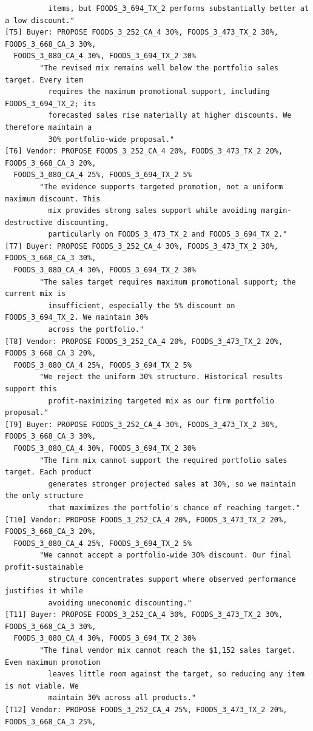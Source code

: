 {\begin{verbatim}
          items, but FOODS_3_694_TX_2 performs substantially better at a low discount."
[T5] Buyer: PROPOSE FOODS_3_252_CA_4 30%, FOODS_3_473_TX_2 30%, FOODS_3_668_CA_3 30%,
  FOODS_3_080_CA_4 30%, FOODS_3_694_TX_2 30%
        "The revised mix remains well below the portfolio sales target. Every item
          requires the maximum promotional support, including FOODS_3_694_TX_2; its
          forecasted sales rise materially at higher discounts. We therefore maintain a
          30% portfolio-wide proposal."
[T6] Vendor: PROPOSE FOODS_3_252_CA_4 20%, FOODS_3_473_TX_2 20%, FOODS_3_668_CA_3 20%,
  FOODS_3_080_CA_4 25%, FOODS_3_694_TX_2 5%
        "The evidence supports targeted promotion, not a uniform maximum discount. This
          mix provides strong sales support while avoiding margin-destructive discounting,
          particularly on FOODS_3_473_TX_2 and FOODS_3_694_TX_2."
[T7] Buyer: PROPOSE FOODS_3_252_CA_4 30%, FOODS_3_473_TX_2 30%, FOODS_3_668_CA_3 30%,
  FOODS_3_080_CA_4 30%, FOODS_3_694_TX_2 30%
        "The sales target requires maximum promotional support; the current mix is
          insufficient, especially the 5% discount on FOODS_3_694_TX_2. We maintain 30%
          across the portfolio."
[T8] Vendor: PROPOSE FOODS_3_252_CA_4 20%, FOODS_3_473_TX_2 20%, FOODS_3_668_CA_3 20%,
  FOODS_3_080_CA_4 25%, FOODS_3_694_TX_2 5%
        "We reject the uniform 30% structure. Historical results support this
          profit-maximizing targeted mix as our firm portfolio proposal."
[T9] Buyer: PROPOSE FOODS_3_252_CA_4 30%, FOODS_3_473_TX_2 30%, FOODS_3_668_CA_3 30%,
  FOODS_3_080_CA_4 30%, FOODS_3_694_TX_2 30%
        "The firm mix cannot support the required portfolio sales target. Each product
          generates stronger projected sales at 30%, so we maintain the only structure
          that maximizes the portfolio's chance of reaching target."
[T10] Vendor: PROPOSE FOODS_3_252_CA_4 20%, FOODS_3_473_TX_2 20%, FOODS_3_668_CA_3 20%,
  FOODS_3_080_CA_4 25%, FOODS_3_694_TX_2 5%
        "We cannot accept a portfolio-wide 30% discount. Our final profit-sustainable
          structure concentrates support where observed performance justifies it while
          avoiding uneconomic discounting."
[T11] Buyer: PROPOSE FOODS_3_252_CA_4 30%, FOODS_3_473_TX_2 30%, FOODS_3_668_CA_3 30%,
  FOODS_3_080_CA_4 30%, FOODS_3_694_TX_2 30%
        "The final vendor mix cannot reach the $1,152 sales target. Even maximum promotion
          leaves little room against the target, so reducing any item is not viable. We
          maintain 30% across all products."
[T12] Vendor: PROPOSE FOODS_3_252_CA_4 25%, FOODS_3_473_TX_2 20%, FOODS_3_668_CA_3 25%,

\end{verbatim}}
